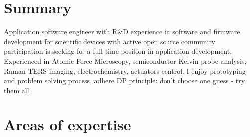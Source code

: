 \documentclass{sb_cv}
\begin{document}
\makecvtitle
\vspace*{-15mm}

\section{Summary}

Application software engineer with R\&D experience in software and firmware development for scientific devices with active open source community participation is seeking for a full time position in application development. Experienced in Atomic Force Microscopy, semiconductor Kelvin probe analysis, Raman TERS imaging, electrochemistry, actuators control. I enjoy prototyping and problem solving process, adhere DP principle: don't choose one guess - try them all.

\vspace*{-3mm}
\section{Areas of expertise}

\vspace*{-3mm}
\end{document}
